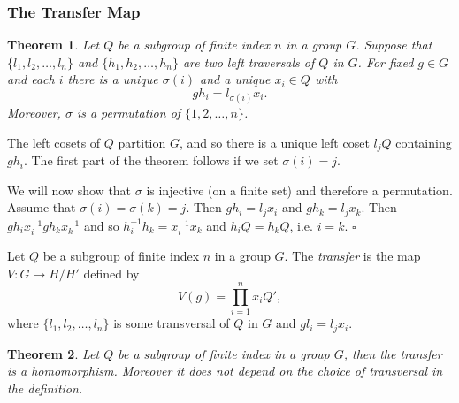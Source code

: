 \documentclass[10pt]{article}
\newtheorem{theorem}{Theorem}[section]
\newenvironment{proof}[1][Proof]{\begin{trivlist}
\item[\hskip \labelsep {\itshape #1}]}{\end{trivlist}}
\newenvironment{definition}[1][Definition]{\begin{trivlist}
\item[\hskip \labelsep {\bfseries #1}]}{\end{trivlist}}
\begin{document}
\subsubsection{The Transfer Map}

\begin{theorem}
Let $Q$ be a subgroup of finite index $n$ in a group $G$. Suppose that $\{l_1, l_2, \ldots, l_n\}$ and $\{h_1, h_2, \ldots, h_n\}$ are two left traversals of $Q$ in $G$. For fixed $g \in G$ and each $i$ there is a unique $\sigma(i)$ and a unique $x_i \in Q$ with
$$gh_i = l_{\sigma(i)}x_i.$$
Moreover, $\sigma$ is a permutation of $\{1, 2, \ldots, n\}$.
\end{theorem}

\begin{proof}
The left cosets of $Q$ partition $G$, and so there is a unique left coset $l_jQ$ containing $gh_i$. The first part of the theorem follows if we set $\sigma(i) = j$.

We will now show that $\sigma$ is injective (on a finite set) and therefore a permutation. Assume that $\sigma(i) = \sigma(k) = j$. Then $gh_i = l_jx_i$ and $gh_k = l_jx_k$. Then $gh_ix_i^{-1}  gh_kx_k^{-1}$ and so $h_i^{-1}h_k = x_i^{-1}x_k$ and $h_iQ = h_kQ$, i.e. $i = k$. $\square$
\end{proof}

\begin{definition}
Let $Q$ be a subgroup of finite index $n$ in a group $G$. The \emph{transfer} is the map $V : G \to H/H'$ defined by
$$V(g) = \prod_{i=1}^n x_iQ',$$
where $\{l_1, l_2, \ldots, l_n\}$ is some transversal of $Q$ in $G$ and $gl_i = l_jx_i$.
\end{definition}

\begin{theorem}
Let $Q$ be a subgroup of finite index in a group $G$, then the transfer is a homomorphism. Moreover it does not depend on the choice of transversal in the definition.
\end{theorem}
\end{document}
